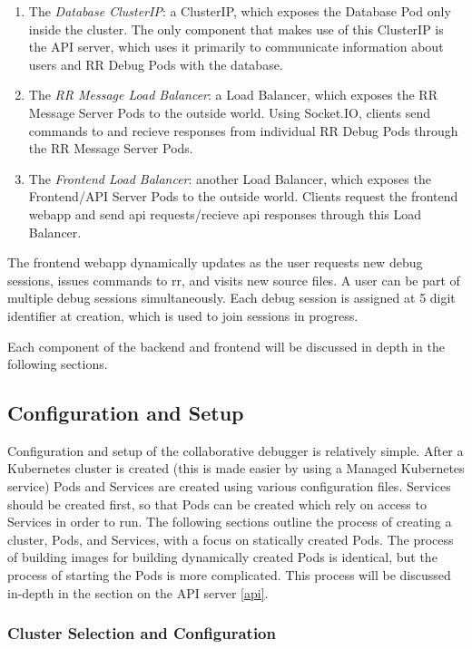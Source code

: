 \documentclass[12pt]{article}
\begin{document}
\begin{enumerate}
\item The \textit{Database ClusterIP}: a ClusterIP, which exposes the
  Database Pod only inside the cluster.  The only component that makes
  use of this ClusterIP is the API server, which uses it primarily to
  communicate information about users and RR Debug Pods with the
  database.
\item The \textit{RR Message Load Balancer}: a Load Balancer, which
  exposes the RR Message Server Pods to the outside world.  Using
  Socket.IO, clients send commands to and recieve responses from
  individual RR Debug Pods through the RR Message Server Pods.
\item The \textit{Frontend Load Balancer}: another Load Balancer,
  which exposes the Frontend/API Server Pods to the outside world.
  Clients request the frontend webapp and send api requests/recieve
  api responses through this Load Balancer.
\end{enumerate}

The frontend webapp dynamically updates as the user requests new debug
sessions, issues commands to rr, and visits new source files.  A user
can be part of multiple debug sessions simultaneously.  Each debug
session is assigned at 5 digit identifier at creation, which is used
to join sessions in progress.
\par

Each component of the backend and
frontend will be discussed in depth in the following sections.

\subsection{Configuration and Setup}

Configuration and setup of the collaborative debugger is relatively
simple.  After a Kubernetes cluster is created (this is made easier by
using a Managed Kubernetes service) Pods and Services are created
using various configuration files.  Services should be created first,
so that Pods can be created which rely on access to Services in order
to run.  The following sections outline the process of creating a
cluster, Pods, and Services, with a focus on statically created Pods.
The process of building images for building dynamically created Pods
is identical, but the process of starting the Pods is more
complicated.  This process will be discussed in-depth in the section
on the API server \ref{api}.

\subsubsection{Cluster Selection and Configuration}
\end{document}
